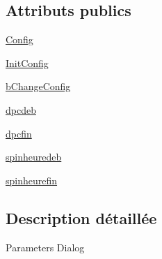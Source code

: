 \subsection*{Attributs publics}
\begin{DoxyCompactItemize}
\item 
\hyperlink{classwxpy__aot__pm10__by__year__sep__x__2009__v2_1_1_parm_dialog_aee9bc2ac3794e5830a148e83cc87abc0}{Config}
\item 
\hyperlink{classwxpy__aot__pm10__by__year__sep__x__2009__v2_1_1_parm_dialog_aa3ed41206bac917476d7ce1fdd76170b}{Init\-Config}
\item 
\hyperlink{classwxpy__aot__pm10__by__year__sep__x__2009__v2_1_1_parm_dialog_af139ccb8287e43729c2057321f17968f}{b\-Change\-Config}
\item 
\hyperlink{classwxpy__aot__pm10__by__year__sep__x__2009__v2_1_1_parm_dialog_a9fa9e46076e1f62717979307e5782a18}{dpcdeb}
\item 
\hyperlink{classwxpy__aot__pm10__by__year__sep__x__2009__v2_1_1_parm_dialog_ab7cdb60dbd62e1f7296d9c993a7684ec}{dpcfin}
\item 
\hyperlink{classwxpy__aot__pm10__by__year__sep__x__2009__v2_1_1_parm_dialog_a9fef301acbdda4e13b5e195f816f7024}{spinheuredeb}
\item 
\hyperlink{classwxpy__aot__pm10__by__year__sep__x__2009__v2_1_1_parm_dialog_a437721aaac31caec2fea2c28450c3ebb}{spinheurefin}
\end{DoxyCompactItemize}


\subsection{Description détaillée}
\begin{DoxyVerb}Parameters Dialog \end{DoxyVerb}
 

